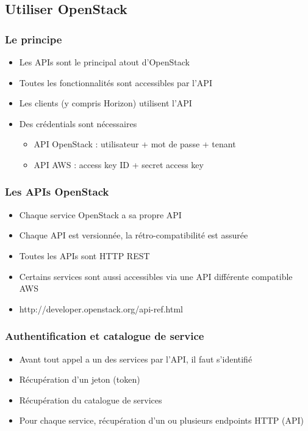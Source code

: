   \subsection[Utilisation]{Utiliser OpenStack}

  \begin{frame}
    \frametitle{Le principe}
    \begin{itemize}
      \item Les APIs sont le principal atout d'OpenStack
      \item Toutes les fonctionnalités sont accessibles par l'API
      \item Les clients (y compris Horizon) utilisent l'API
      \item Des crédentials sont nécessaires
      \begin{itemize}
        \item API OpenStack : utilisateur + mot de passe + tenant
        \item API AWS : access key ID + secret access key
      \end{itemize}
    \end{itemize}
  \end{frame}

  \begin{frame}
    \frametitle{Les APIs OpenStack}
    \begin{itemize}
      \item Chaque service OpenStack a sa propre API
      \item Chaque API est versionnée, la rétro-compatibilité est assurée
      \item Toutes les APIs sont HTTP REST
      \item Certains services sont aussi accessibles via une API différente compatible AWS
      \item http://developer.openstack.org/api-ref.html
    \end{itemize}
  \end{frame}

  \begin{frame}
    \frametitle{Authentification et catalogue de service}
    \begin{itemize}
      \item Avant tout appel a un des services par l'API, il faut s'identifié
      \item Récupération d'un jeton (token)
      \item Récupération du catalogue de services
      \item Pour chaque service, récupération d'un ou plusieurs endpoints HTTP (API)
    \end{itemize}
  \end{frame}

